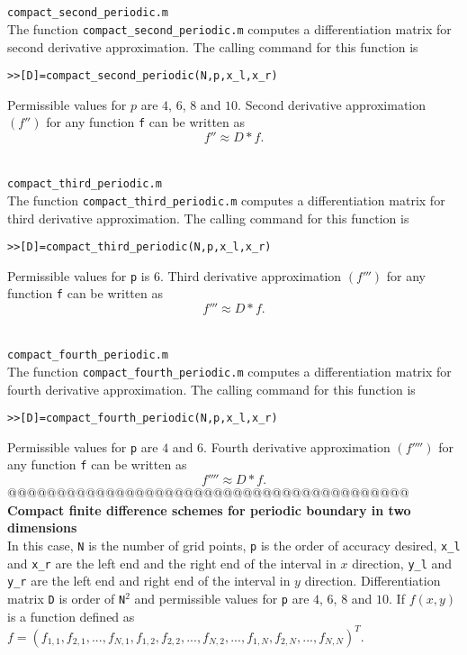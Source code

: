 \documentclass[acmtoms]{acmtrans2m}
\begin{document}
\section{} \verb#compact_second_periodic.m#\\
 The function \verb#compact_second_periodic.m# computes a differentiation matrix for second derivative approximation. The calling command for this function is
\begin{alltt}
>>[D]=compact_second_periodic(N,p,x_l,x_r)
\end{alltt}
Permissible values for $p$ are $4$, $6$, $8$ and $10$. Second derivative approximation $(f'')$ for any function \verb#f# can be written as
\[
f''\approx D*f.
\]
\section{} \verb#compact_third_periodic.m#\\
 The function \verb#compact_third_periodic.m# computes a differentiation matrix for third derivative approximation. The calling command for this function is
\begin{alltt}
>>[D]=compact_third_periodic(N,p,x_l,x_r)
\end{alltt}
Permissible values for \verb#p# is $6$. Third derivative approximation $(f''')$ for any function \verb#f# can be written as
\[
f'''\approx D*f.
\]
\section{} \verb#compact_fourth_periodic.m#\\
 The function \verb#compact_fourth_periodic.m# computes a differentiation matrix for fourth derivative approximation. The calling command for this function is
\begin{alltt}
>>[D]=compact_fourth_periodic(N,p,x_l,x_r)
\end{alltt}
Permissible values for \verb#p# are $4$ and $6$. Fourth derivative approximation $(f'''')$ for any function \verb#f# can be written as
\[
f''''\approx D*f.
\]
@@@@@@@@@@@@@@@@@@@@@@@@@@@@@@@@@@@@@@@@@\\
\textbf{Compact finite difference schemes for periodic boundary in two dimensions}\\
 In this case, \verb#N# is the number of grid points, \verb#p# is the order of accuracy desired, \verb#x_l# and \verb#x_r#  are the left end and the right end of the interval in $x$ direction, \verb#y_l# and \verb#y_r# are the left end and right end of the interval in $y$ direction. Differentiation matrix \verb#D# is order of \verb#N#$^2$ and permissible values for \verb#p# are $4$, $6$, $8$ and $10$. If $f(x,y)$ is a function defined as $f=(f_{1,1},f_{2,1},...,f_{N,1},f_{1,2},f_{2,2},...,f_{N,2},...,f_{1,N},f_{2,N},...,f_{N,N})^T$.
\end{document}
